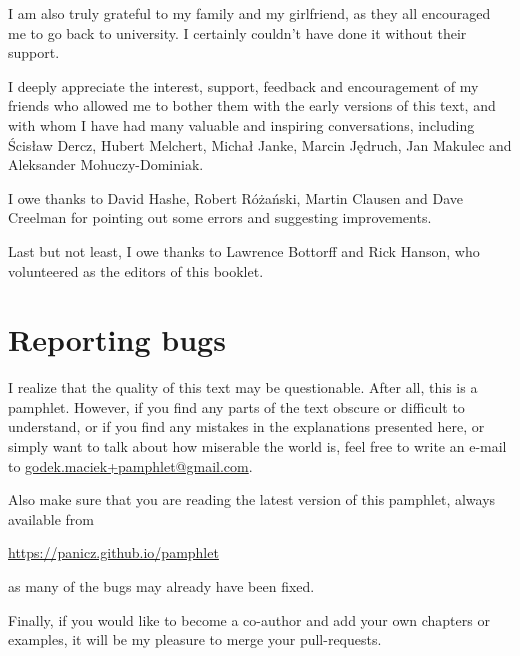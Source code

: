 I am also truly grateful to my family and my girlfriend,
as they all encouraged me to go back to university. I certainly
couldn't have done it without their support.

I deeply appreciate the interest, support, feedback and
encouragement of my friends who allowed me to bother them with
the early versions of this text, and with whom I have had many
valuable and inspiring conversations, including Ścisław Dercz,
Hubert Melchert, Michał Janke, Marcin Jędruch, Jan Makulec
and Aleksander Mohuczy-Dominiak. 

I owe thanks to David Hashe, Robert Różański, Martin Clausen
and Dave Creelman for pointing out some errors and suggesting
improvements.

Last but not least, I owe thanks to Lawrence Bottorff and Rick Hanson,
who volunteered as the editors of this booklet.

\section*{Reporting bugs}

I realize that the quality of this text may be questionable.
After all, this is a pamphlet. However, if you find any parts
of the text obscure or difficult to understand, or if you
find any mistakes in the explanations presented here, or
simply want to talk about how miserable the world is, feel
free to write an e-mail to
\href{mailto:godek.maciek+pamphlet@gmail.com}{godek.maciek+pamphlet@gmail.com}.

Also make sure that you are reading the latest version
of this pamphlet, always available from

\url{https://panicz.github.io/pamphlet}

\noindent as many of the bugs may already have been fixed.

Finally, if you would like to become a co-author and add your
own chapters or examples, it will be my pleasure to merge your
pull-requests.
